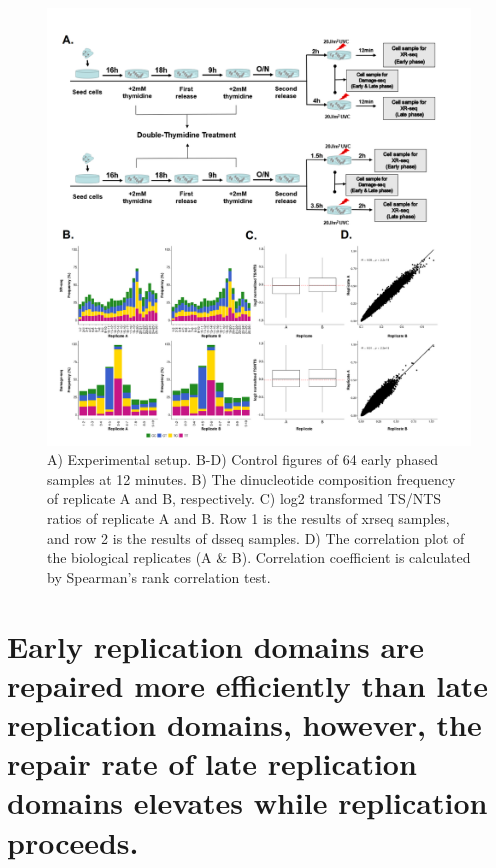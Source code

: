 \shorthandoff{=}
\begin{figure}[H]
    \begin{center}
    \includegraphics[width=\textwidth]{Chapters/4_results/figures/fig1}
    \caption[Experimental setup.]{A) Experimental setup. B-D) Control figures of \gls{64} early phased samples at 12 minutes. B) The dinucleotide composition frequency of replicate A and B, respectively. C) log2 transformed TS/NTS ratios of replicate A and B. Row 1 is the results of \gls{xrseq} samples, and row 2 is the results of \gls{dsseq} samples. D) The correlation plot of the biological replicates (A \& B). Correlation coefficient is calculated by Spearman’s rank correlation test.}
    \label{fig:intro}
    \end{center}
    \end{figure}


\section{Early replication domains are repaired more efficiently than late replication domains, however, the repair rate of late replication domains elevates while replication proceeds.}

